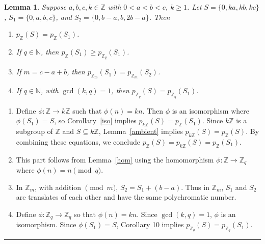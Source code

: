 \documentclass[12pt]{article}
\newenvironment{proof}{{\bf Proof:  }}{\hfill\rule{2mm}{2mm}}
\newtheorem{lemma}[theorem]{Lemma}
\newcommand{\Z}{\ensuremath{\mathbb Z}}
\newcommand{\N}{\ensuremath{\mathbb N}}
\begin{document}
\begin{lemma}\label{reduc}
Suppose $a,b,c, k \in \Z$ with $0<a<b<c$,  $k \ge 1$. Let $S = \{0,ka,kb,kc\}$, $S_1 = \{0, a, b, c\}$, and $S_2 = \{0, b-a, b, 2b-a\}$.  Then 
\begin{enumerate}
\item[(i)] $p_{\Z}(S) = p_{\Z}(S_1)$.
\item[(ii)] If $q \in \N$, then $p_{\Z}(S_1) \ge p_{\Z_q}(S_1)$.
\item[(iii)] If $m=c-a+b$, then $p_{\Z_m}(S_1) = p_{\Z_m}(S_2)$.
\item[(iv)] If $q \in \N$, with $\gcd(k,q) = 1$, then  $p_{\Z_q}(S) = p_{\Z_q}(S_1)$.
\end{enumerate}
\end{lemma}
\begin{proof}
\begin{enumerate}
\item[(i)] Define $\phi: \Z \to k\Z$ such that $\phi(n) = kn$.  Then $\phi$ is an isomorphism where $\phi(S_1) = S$, so Corollary~\ref{iso} implies  $p_{k\Z}(S) = p_\Z(S_1)$. Since $k\Z$ is a subgroup of $\Z$ and $S \subseteq k\Z$, Lemma~\ref{ambient} implies $p_{k\Z}(S) = p_\Z(S)$.  By combining these equations, we conclude $p_\Z(S) = p_{k\Z}(S) = p_\Z(S_1)$.
\item[(ii)] This part follows from Lemma~\ref{hom} using the homomorphism $\phi:\Z \to \Z_q$ where $\phi(n) = n \pmod{q}$.
\item[(iii)] In $\Z_m$, with addition $\pmod{m}$,  $S_2 = S_1 + (b-a)$. Thus in $\Z_m$, $S_1$ and $S_2$ are translates of each other and have the same polychromatic number.
\item[(iv)]  Define $\phi:\Z_q \to \Z_q$ so that $\phi(n) = kn$. Since $\gcd(k,q)=1$, $\phi$ is an isomorphism.  Since $\phi(S_1) = S$, Corollary 10 implies $p_{\Z_q}(S) = p_{\Z_q}(S_1)$.
\end{enumerate}
\end{proof}
\end{document}
